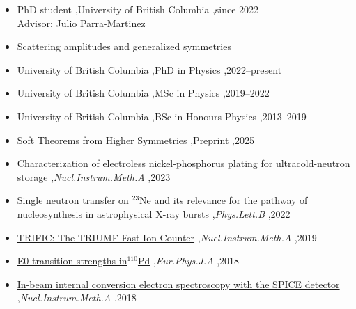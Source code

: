 \documentclass[letterpaper,10pt]{article}
\begin{document}


\begin{itemize}
\item PhD student \sep University of British Columbia \sep since 2022\\
Advisor: Julio Parra-Martinez
\end{itemize}


\begin{itemize}
\item Scattering amplitudes and generalized symmetries
\end{itemize}


\begin{itemize}
\item University of British Columbia \sep PhD in Physics \sep 2022--present
\item University of British Columbia \sep MSc in Physics \sep 2019--2022
\item University of British Columbia \sep BSc in Honours Physics \sep 2013--2019
\end{itemize}


\begin{itemize}
\item \href{https://arxiv.org/abs/2505.03566}{\textcolor{DodgerBlue4}{Soft Theorems from Higher Symmetries}}  \sep Preprint \sep 2025
\item \href{https://arxiv.org/abs/2208.05590}{\textcolor{DodgerBlue4}{Characterization of electroless nickel-phosphorus plating for ultracold-neutron storage}}  \sep \textit{Nucl.Instrum.Meth.A} \sep 2023
\item \href{https://arxiv.org/abs/2208.08481}{\textcolor{DodgerBlue4}{Single neutron transfer on $^{23}$Ne and its relevance for the pathway of nucleosynthesis in astrophysical X-ray bursts}}  \sep \textit{Phys.Lett.B} \sep 2022
\item \href{https://doi.org/10.1016/j.nima.2019.03.075}{\textcolor{DodgerBlue4}{TRIFIC: The TRIUMF Fast Ion Counter}}  \sep \textit{Nucl.Instrum.Meth.A} \sep 2019
\item \href{https://doi.org/10.1140/epja/i2018-12604-5}{\textcolor{DodgerBlue4}{E0 transition strengths in$^{110}$Pd}}  \sep \textit{Eur.Phys.J.A} \sep 2018
\item \href{https://arxiv.org/abs/1808.03683}{\textcolor{DodgerBlue4}{In-beam internal conversion electron spectroscopy with the SPICE detector}}  \sep \textit{Nucl.Instrum.Meth.A} \sep 2018
\end{itemize}
\end{document}
